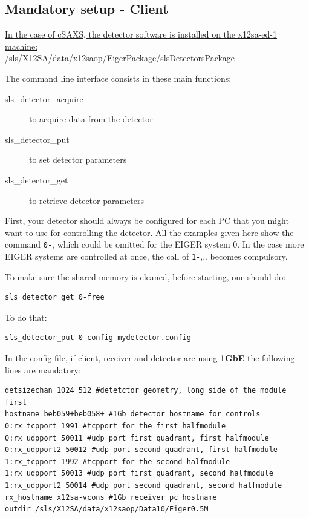 \documentclass{article}
\begin{document}
\subsection{Mandatory setup - Client}

\underline{In the case of cSAXS, the detector software is installed on the x12sa-ed-1 machine:}\\
\underline{/sls/X12SA/data/x12saop/EigerPackage/slsDetectorsPackage}

The command line interface consists in these main functions:
\begin{description}
\item[sls\_detector\_acquire] to acquire data from the detector
\item[sls\_detector\_put] to set detector parameters
\item[sls\_detector\_get] to retrieve detector parameters
\end{description}

First, your detector should always be configured for each PC that you might want to use for controlling the detector. All the examples given here show the command {\tt{0-}}, which could be omitted for the EIGER system $0$. In the case more EIGER systems are controlled at once, the call of {\tt{1-}},.. becomes compulsory.

To make sure the shared memory is cleaned, before starting, one should do:  
\begin{verbatim}
sls_detector_get 0-free
\end{verbatim}
To do that:
\begin{verbatim}
sls_detector_put 0-config mydetector.config
\end{verbatim}

In the config file, if client, receiver and detector are using \textbf{1GbE} the following lines are mandatory:
\begin{verbatim}
detsizechan 1024 512 #detetctor geometry, long side of the module first
hostname beb059+beb058+ #1Gb detector hostname for controls
0:rx_tcpport 1991 #tcpport for the first halfmodule                 
0:rx_udpport 50011 #udp port first quadrant, first halfmodule         
0:rx_udpport2 50012 #udp port second quadrant, first halfmodule       
1:rx_tcpport 1992 #tcpport for the second halfmodule               
1:rx_udpport 50013 #udp port first quadrant, second halfmodule       
1:rx_udpport2 50014 #udp port second quadrant, second halfmodule      
rx_hostname x12sa-vcons #1Gb receiver pc hostname
outdir /sls/X12SA/data/x12saop/Data10/Eiger0.5M
\end{verbatim}
\end{document}
